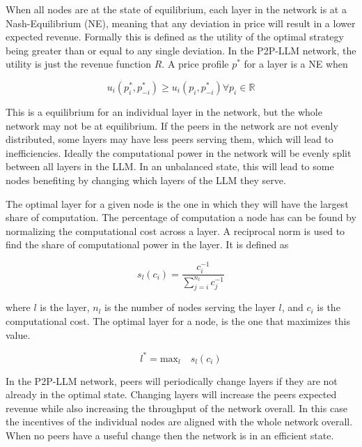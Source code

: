 \documentclass[preprint,twoside,11pt]{article}
\begin{document}
When all nodes are at the state of equilibrium, each layer in the network is at a Nash-Equilibrium (NE), meaning that any deviation in price
will result in a lower expected revenue. Formally this is defined as the utility of the optimal strategy being greater than or equal to any single deviation.
In the P2P-LLM network, the utility is just the revenue function $R$.
A price profile $p^*$ for a layer is a NE when

\begin{equation}
	u_i(p_i^*, p^*_{-i}) \geq u_i(p_i, p^*_{-i}) \forall p_i \in \mathbb{R}
\end{equation}

This is a equilibrium for an individual layer in the network, but the whole network may
not be at equilibrium. If the peers in the network are not evenly distributed,
some layers may have less peers serving them, which will lead to inefficiencies.
Ideally the computational power in the network will be evenly split between all layers
in the LLM. In an unbalanced state, this will lead to some nodes benefiting by changing which layers of the LLM they serve.

The optimal layer for a given node is the one in which they will have the largest
share of computation. The percentage of computation a node has can be found by normalizing the
computational cost across a layer. A reciprocal norm is used to find the share of computational power in the layer.
It is defined as

\begin{equation}
	s_l(c_i) = \frac{c_i^{-1}}{\sum_{j=i}^{n_l}c_j^{-1}}
	\label{eq:norm}
\end{equation}

where $l$ is the layer, $n_l$ is the number of nodes serving the layer $l$, and $c_i$ is the computational cost.
The optimal layer for a node, is the one that maximizes this value.

\begin{equation}
	l^* = \text{max}_l \quad s_l(c_i)
	\label{eq:max}
\end{equation}

In the P2P-LLM network, peers will periodically change layers if they are not already in the optimal state.
Changing layers will increase the peers expected revenue while also increasing the throughput of the network overall.
In this case the incentives of the individual nodes are aligned with the whole network overall.
When no peers have a useful change then the network is in an efficient state.
\end{document}
